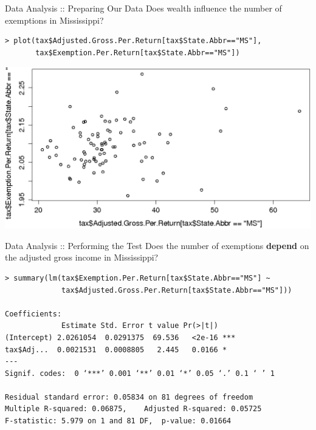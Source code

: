 \documentclass{beamer}
\begin{document}
\begin{frame}[fragile]{Data Analysis :: Preparing Our Data}
Does wealth influence the number of exemptions in Mississippi?

\begin{footnotesize}
\begin{verbatim}
> plot(tax$Adjusted.Gross.Per.Return[tax$State.Abbr=="MS"],
       tax$Exemption.Per.Return[tax$State.Abbr=="MS"])
\end{verbatim}
\end{footnotesize}

\includegraphics[scale=0.24]{income_v_exemptions_ms.eps}

\end{frame}

\begin{frame}[fragile]{Data Analysis :: Performing the Test}
Does the number of exemptions \textbf{depend} on the adjusted gross income in Mississippi?

\begin{footnotesize}
\begin{verbatim}
> summary(lm(tax$Exemption.Per.Return[tax$State.Abbr=="MS"] ~
             tax$Adjusted.Gross.Per.Return[tax$State.Abbr=="MS"]))

Coefficients:
             Estimate Std. Error t value Pr(>|t|)    
(Intercept) 2.0261054  0.0291375  69.536   <2e-16 ***
tax$Adj...  0.0021531  0.0008805   2.445   0.0166 *  
---
Signif. codes:  0 ‘***’ 0.001 ‘**’ 0.01 ‘*’ 0.05 ‘.’ 0.1 ‘ ’ 1 

Residual standard error: 0.05834 on 81 degrees of freedom
Multiple R-squared: 0.06875,    Adjusted R-squared: 0.05725 
F-statistic: 5.979 on 1 and 81 DF,  p-value: 0.01664
\end{verbatim}
\end{footnotesize}

\end{frame}
\end{document}
